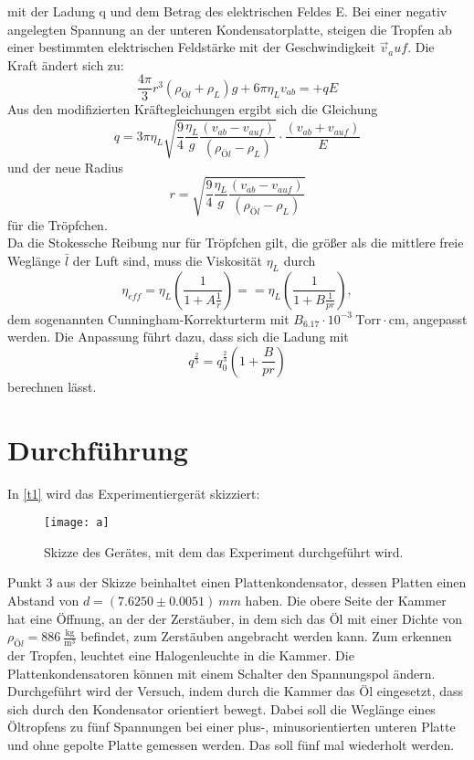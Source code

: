 \documentclass[a4paper]{scrartcl}
\begin{document}
mit der Ladung q und dem Betrag des elektrischen Feldes E. Bei einer negativ angelegten Spannung an der unteren Kondensatorplatte, steigen die Tropfen ab einer bestimmten elektrischen Feldstärke mit der Geschwindigkeit $\vec v_auf$. Die Kraft ändert sich zu:
\begin{equation*}
  \frac{4\pi}{3}r^3(\rho_{Öl}+\rho_{L})g+6\pi\eta_{L}v_{ab}=+qE
\end{equation*}
Aus den modifizierten Kräftegleichungen ergibt sich die Gleichung
\begin{equation*}
  q=3\pi\eta_{L}\sqrt{\frac{9}{4}\frac{\eta_{L}}{g}\frac{(v_{ab}-v_{auf})}{(\rho_{Öl}-\rho_{L})}}\cdot\frac{(v_{ab}+v_{auf})}{E}
\end{equation*}
und der neue Radius
\begin{equation*}
  r=\sqrt{\frac{9}{4}\frac{\eta_{L}}{g}\frac{(v_{ab}-v_{auf})}{(\rho_{Öl}-\rho_{L})}}
\end{equation*}
für die Tröpfchen.\\
Da die Stokessche Reibung nur für Tröpfchen gilt, die größer als die mittlere freie Weglänge $\bar l$ der Luft sind, muss die Viskosität $\eta_{L}$ durch
\begin{equation*}
  \eta_{eff}=\eta_{L}\left(\frac{1}{1+A\frac{1}{r}}\right)==\eta_{L}\left(\frac{1}{1+B\frac{1}{pr}}\right),
\end{equation*}
dem sogenannten Cunningham-Korrekturterm mit $B_6.17\cdot10^{-3}\ \mathrm{Torr}\cdot\mathrm{cm}$, angepasst werden. Die Anpassung führt dazu, dass sich die Ladung mit
\begin{equation*}
  q^{\frac{2}{3}}=q_{0}^{\frac{2}{3}}(1+\frac{B}{pr})
\end{equation*}
berechnen lässt.

\section{Durchführung}
In \autoref{t1} wird das Experimentiergerät skizziert:
\begin{figure}
  \centering
  \texttt{[image: a]}
  \caption{Skizze des Gerätes, mit dem das Experiment durchgeführt wird.}
  \label{t1}
\end{figure}
Punkt 3 aus der Skizze beinhaltet einen Plattenkondensator, dessen Platten einen Abstand von $d=(7.6250 \pm 0.0051)\ mm$ haben. Die obere Seite der Kammer hat eine Öffnung, an der der Zerstäuber, in dem sich das Öl mit einer Dichte von $\rho_{Öl}=886\ \frac{\mathrm{kg}}{\mathrm{m}^3}$ befindet, zum Zerstäuben angebracht werden kann. Zum erkennen der Tropfen, leuchtet eine Halogenleuchte in die Kammer. Die Plattenkondensatoren können mit einem Schalter den Spannungspol ändern.\\
Durchgeführt wird der Versuch, indem durch die Kammer das Öl eingesetzt, dass sich durch den Kondensator orientiert bewegt. Dabei soll die Weglänge eines Öltropfens zu fünf Spannungen bei einer plus-, minusorientierten unteren Platte und ohne gepolte Platte gemessen werden. Das soll fünf mal wiederholt werden. 
\end{document}
